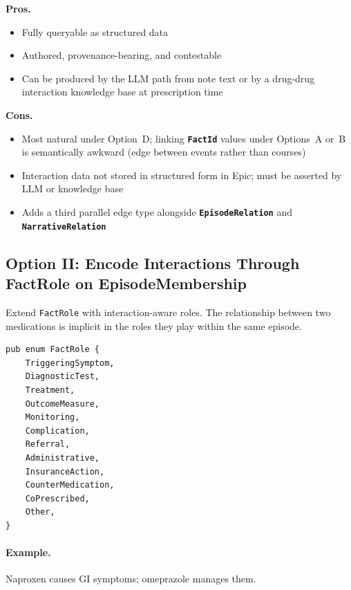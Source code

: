 \documentclass[11pt]{article}
\newcommand{\entity}[1]{\texttt{\textbf{#1}}}
\newcommand{\field}[1]{\texttt{#1}}
\newenvironment{prosbox}{%
  \begin{mdframed}[backgroundcolor=notegreen,
    linecolor=noteborder, linewidth=1pt,
    innertopmargin=8pt, innerbottommargin=8pt,
    innerleftmargin=10pt, innerrightmargin=10pt]
  \small
}{%
  \end{mdframed}
}
\newenvironment{consbox}{%
  \begin{mdframed}[backgroundcolor=warningyellow,
    linecolor=warningborder, linewidth=1pt,
    innertopmargin=8pt, innerbottommargin=8pt,
    innerleftmargin=10pt, innerrightmargin=10pt]
  \small
}{%
  \end{mdframed}
}
\begin{document}
\begin{prosbox}
\textbf{Pros.}
\begin{itemize}[noitemsep]
  \item Fully queryable as structured data
  \item Authored, provenance-bearing, and contestable
  \item Can be produced by the LLM path from note text or by a
    drug-drug interaction knowledge base at prescription time
\end{itemize}
\end{prosbox}

\begin{consbox}
\textbf{Cons.}
\begin{itemize}[noitemsep]
  \item Most natural under Option~D; linking \entity{FactId} values
    under Options~A or~B is semantically awkward (edge between events
    rather than courses)
  \item Interaction data not stored in structured form in Epic; must
    be asserted by LLM or knowledge base
  \item Adds a third parallel edge type alongside \entity{EpisodeRelation}
    and \entity{NarrativeRelation}
\end{itemize}
\end{consbox}

\subsection{Option II: Encode Interactions Through FactRole on EpisodeMembership}
\label{sec:interaction-option-ii}

Extend \field{FactRole} with interaction-aware roles. The relationship
between two medications is implicit in the roles they play within the
same episode.

\begin{lstlisting}
pub enum FactRole {
    TriggeringSymptom,
    DiagnosticTest,
    Treatment,
    OutcomeMeasure,
    Monitoring,
    Complication,
    Referral,
    Administrative,
    InsuranceAction,
    CounterMedication,
    CoPrescribed,
    Other,
}
\end{lstlisting}

\paragraph{Example.} Naproxen causes GI symptoms; omeprazole manages them.
\end{document}
